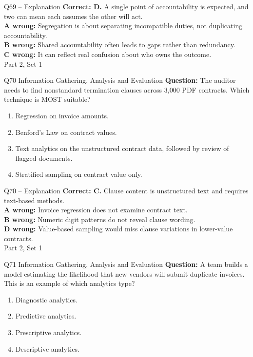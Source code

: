 \documentclass[aspectratio=169,10pt]{beamer}
\begin{document}
\begin{frame}[t]{Q69 -- Explanation}
	\footnotesize
	\textbf{Correct: D.} A single point of accountability is expected, and two can mean each assumes the other will act. \\[5pt]
\textbf{A wrong:} Segregation is about separating incompatible duties, not duplicating accountability. \\[3pt]
\textbf{B wrong:} Shared accountability often leads to gaps rather than redundancy. \\[3pt]
\textbf{C wrong:} It can reflect real confusion about who owns the outcome. \\[3pt]
	\vfill {\tiny Part 2, Set 1}
\end{frame}
\begin{frame}[t]{Q70 \hfill {\scriptsize Information Gathering, Analysis and Evaluation}}
	\small
	\textbf{Question:} The auditor needs to find nonstandard termination clauses across 3,000 PDF contracts. Which technique is MOST suitable?
	\begin{enumerate}[label=\Alph*.,itemsep=1pt,topsep=3pt]
			\item Regression on invoice amounts.
			\item Benford's Law on contract values.
			\item Text analytics on the unstructured contract data, followed by review of flagged documents.
			\item Stratified sampling on contract value only.
	\end{enumerate}
\end{frame}
\begin{frame}[t]{Q70 -- Explanation}
	\footnotesize
	\textbf{Correct: C.} Clause content is unstructured text and requires text-based methods. \\[5pt]
\textbf{A wrong:} Invoice regression does not examine contract text. \\[3pt]
\textbf{B wrong:} Numeric digit patterns do not reveal clause wording. \\[3pt]
\textbf{D wrong:} Value-based sampling would miss clause variations in lower-value contracts. \\[3pt]
	\vfill {\tiny Part 2, Set 1}
\end{frame}
\begin{frame}[t]{Q71 \hfill {\scriptsize Information Gathering, Analysis and Evaluation}}
	\small
	\textbf{Question:} A team builds a model estimating the likelihood that new vendors will submit duplicate invoices. This is an example of which analytics type?
	\begin{enumerate}[label=\Alph*.,itemsep=1pt,topsep=3pt]
			\item Diagnostic analytics.
			\item Predictive analytics.
			\item Prescriptive analytics.
			\item Descriptive analytics.
	\end{enumerate}
\end{frame}
\end{document}
